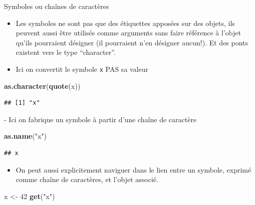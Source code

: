 \documentclass[
  ignorenonframetext,
]{beamer}
\newenvironment{Shaded}{\begin{snugshade}}{\end{snugshade}}
\newcommand{\DecValTok}[1]{\textcolor[rgb]{0.00,0.00,0.81}{#1}}
\newcommand{\FunctionTok}[1]{\textcolor[rgb]{0.13,0.29,0.53}{\textbf{#1}}}
\newcommand{\NormalTok}[1]{#1}
\newcommand{\OtherTok}[1]{\textcolor[rgb]{0.56,0.35,0.01}{#1}}
\newcommand{\StringTok}[1]{\textcolor[rgb]{0.31,0.60,0.02}{#1}}
\providecommand{\tightlist}{%
  \setlength{\itemsep}{0pt}\setlength{\parskip}{0pt}}
\begin{document}
\begin{frame}[fragile]{Symboles ou chaînes de caractères}
\protect\hypertarget{symboles-ou-chauxeenes-de-caractuxe8res}{}
\begin{itemize}
\tightlist
\item
  Les symboles ne sont pas que des étiquettes apposées sur des objets,
  ils peuvent aussi être utilisés comme arguments sans faire référence à
  l'objet qu'ils pourraient désigner (il pourraient n'en désigner
  aucun!). Et des ponts existent vers le type ``character''.
\item
  Ici on convertit le symbole \texttt{x} PAS sa valeur
\end{itemize}

\tiny

\begin{Shaded}
\begin{Highlighting}[]
\FunctionTok{as.character}\NormalTok{(}\FunctionTok{quote}\NormalTok{(x))}
\end{Highlighting}
\end{Shaded}

\begin{verbatim}
## [1] "x"
\end{verbatim}

\normalsize - Ici on fabrique un symbole à partir d'une chaîne de
caractère

\tiny

\begin{Shaded}
\begin{Highlighting}[]
\FunctionTok{as.name}\NormalTok{(}\StringTok{"x"}\NormalTok{)}
\end{Highlighting}
\end{Shaded}

\begin{verbatim}
## x
\end{verbatim}

\normalsize

\begin{itemize}
\tightlist
\item
  On peut aussi explicitement naviguer dans le lien entre un symbole,
  exprimé comme chaîne de caractères, et l'objet associé.
\end{itemize}

\tiny

\begin{Shaded}
\begin{Highlighting}[]
\NormalTok{x }\OtherTok{\textless{}{-}} \DecValTok{42}
\FunctionTok{get}\NormalTok{(}\StringTok{"x"}\NormalTok{)}
\end{Highlighting}
\end{Shaded}


\end{frame}
\end{document}
